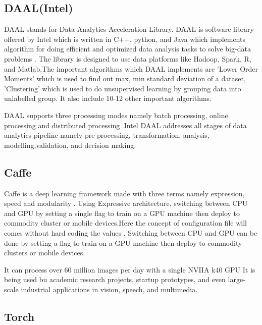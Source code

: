 \subsection{DAAL(Intel)}

    DAAL stands for Data Analytics Acceleration Library. DAAL is
    software library offered by Intel which is written in C++, python,
    and Java which implements algorithm for doing efficient and
    optimized data analysis tasks to solve big-data
    problems \cite{www-daal-wiki}. The library is designed to use
    data platforms like Hadoop, Spark, R, and Matlab.The important
    algorithms which DAAL implements are 'Lower Order Moments' which
    is used to find out max, min standard deviation of a dataset,
    'Clustering' which is used to do unsupervised learning by grouping
    data into unlabelled group. It also include 10-12 other important
    algorithms.

    DAAL supports three processing modes
    namely batch processing, online processing and distributed
    processing \cite{www-daal-official}.Intel DAAL addresses all stages
    of data analytics
    pipeline namely pre-processing, transformation, analysis,
    modelling,validation, and decision making.

    \pv
    
    
\subsection{Caffe}

    Caffe is a deep learning framework made with three terms namely
    expression, speed and modularity \cite{www-caffe}. Using
    Expressive architecture, switching between CPU and GPU by setting
    a single flag to train on a GPU machine then deploy to commodity
    cluster or mobile devices.Here the concept of configuration file
    will comes without hard coding the values . Switching between CPU
    and GPU can be done by setting a flag to train on a GPU machine
    then deploy to commodity clusters or mobile devices.

    It can process over 60 million images per day with a single NVIIA
    k40 GPU It is being used bu academic research projects, startup
    prototypes, and even large-scale industrial applications in
    vision, speech, and multimedia.
    
\subsection{Torch}

